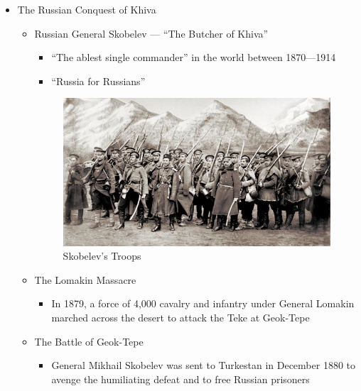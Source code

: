 \begin{itemize}
  \item The Russian Conquest of Khiva

    \begin{itemize}

      \item Russian General Skobelev — ``The Butcher of Khiva''

        \begin{itemize}

          \item ``The ablest single commander'' in the world between 1870—1914

          \item ``Russia for Russians''

        \end{itemize}

        \begin{figure}[h!]
          \centering \includegraphics[width=.7\textwidth]{images/SkobelevTroops.png}
          \caption{Skobelev's Troops}
        \end{figure}

      \item The Lomakin Massacre

        \begin{itemize}

          \item In 1879, a force of 4,000 cavalry and infantry under General Lomakin marched across the desert to attack the Teke at Geok-Tepe

        \end{itemize}

      \item The Battle of Geok-Tepe

        \begin{itemize}

          \item General Mikhail Skobelev was sent to Turkestan in December 1880 to avenge the humiliating defeat and to free Russian prisoners


\end{itemize}
\end{itemize}
\end{itemize}
